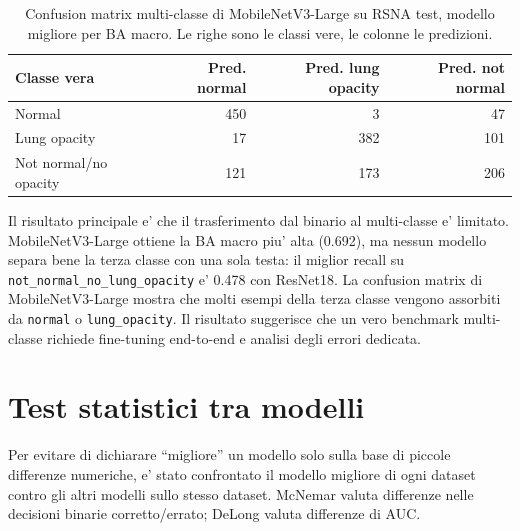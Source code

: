\documentclass[11pt,a4paper]{article}
\begin{document}
\begin{table}[H]
\centering
\caption{Confusion matrix multi-classe di MobileNetV3-Large su RSNA test, modello migliore per BA macro. Le righe sono le classi vere, le colonne le predizioni.}
\begin{tabular}{lrrr}
\toprule
Classe vera & Pred. normal & Pred. lung opacity & Pred. not normal \\
\midrule
Normal & 450 & 3 & 47 \\
Lung opacity & 17 & 382 & 101 \\
Not normal/no opacity & 121 & 173 & 206 \\
\bottomrule
\end{tabular}
\end{table}

Il risultato principale e' che il trasferimento dal binario al multi-classe e'
limitato. MobileNetV3-Large ottiene la BA macro piu' alta (0.692), ma nessun
modello separa bene la terza classe con una sola testa: il miglior recall su
\texttt{not\_normal\_no\_lung\_opacity} e' 0.478 con ResNet18. La confusion
matrix di MobileNetV3-Large mostra che molti esempi della terza classe vengono
assorbiti da \texttt{normal} o \texttt{lung\_opacity}. Il risultato suggerisce
che un vero benchmark multi-classe richiede fine-tuning end-to-end e analisi
degli errori dedicata.

\section{Test statistici tra modelli}

Per evitare di dichiarare ``migliore'' un modello solo sulla base di piccole
differenze numeriche, e' stato confrontato il modello migliore di ogni dataset
contro gli altri modelli sullo stesso dataset. McNemar valuta differenze nelle
decisioni binarie corretto/errato; DeLong valuta differenze di AUC.
\end{document}
